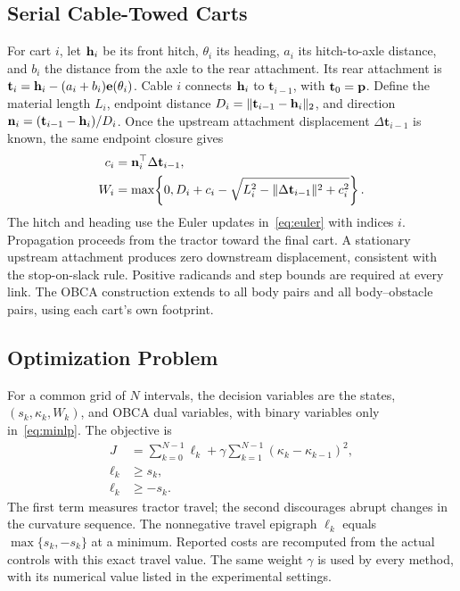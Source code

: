 \subsection{Serial Cable-Towed Carts}
For cart $i$, let $\mathbf h_i$ be its front hitch, $\theta_i$ its heading, $a_i$ its hitch-to-axle distance, and $b_i$ the distance from the axle to the rear attachment. Its rear attachment is $\mathbf t_i=\mathbf h_i-(a_i+b_i)\mathbf e(\theta_i)$. Cable $i$ connects $\mathbf h_i$ to $\mathbf t_{i-1}$, with $\mathbf t_0=\mathbf p$. Define the material length $L_i$, endpoint distance $D_i=\|\mathbf t_{i-1}-\mathbf h_i\|_2$, and direction $\mathbf n_i=(\mathbf t_{i-1}-\mathbf h_i)/D_i$. Once the upstream attachment displacement $\Delta\mathbf t_{i-1}$ is known, the same endpoint closure gives
\begin{equation}\begin{aligned}
c_i&=\mathbf n_i^\top\Delta\mathbf t_{i-1},\\
W_i&=\max\!\left\{0,D_i+c_i-\sqrt{L_i^2-\|\Delta\mathbf t_{i-1}\|^2+c_i^2}\right\}.
\end{aligned}\label{eq:serial}\end{equation}
The hitch and heading use the Euler updates in~\eqref{eq:euler} with indices $i$. Propagation proceeds from the tractor toward the final cart. A stationary upstream attachment produces zero downstream displacement, consistent with the stop-on-slack rule. Positive radicands and step bounds are required at every link. The OBCA construction extends to all body pairs and all body--obstacle pairs, using each cart's own footprint.

\subsection{Optimization Problem}
For a common grid of $N$ intervals, the decision variables are the states, $(s_k,\kappa_k,W_k)$, and OBCA dual variables, with binary variables only in~\eqref{eq:minlp}. The objective is
\begin{equation}
\begin{aligned}
J&=\sum_{k=0}^{N-1}\ell_k+\gamma\sum_{k=1}^{N-1}(\kappa_k-\kappa_{k-1})^2,\\
\ell_k&\geq s_k,\\
\ell_k&\geq -s_k.
\end{aligned}
\label{eq:cost}
\end{equation}
The first term measures tractor travel; the second discourages abrupt changes in the curvature sequence. The nonnegative travel epigraph $\ell_k$ equals $\max\{s_k,-s_k\}$ at a minimum. Reported costs are recomputed from the actual controls with this exact travel value. The same weight $\gamma$ is used by every method, with its numerical value listed in the experimental settings.

